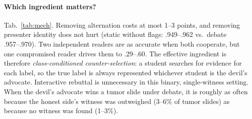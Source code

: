 \documentclass[10pt,twocolumn,letterpaper]{article}
\begin{document}
\begin{table}[t]\centering\small
\caption{\textbf{Which ingredient matters?} CAMELYON16 BA (mean$\pm$sd, 3 seeds), every protocol with its own on-policy judge from the same warm start, equal budget $B$. Static: each side selects $B/2$ items for its label without seeing the other side.}\label{tab:mech}
\setlength{\tabcolsep}{3pt}
\end{table}
\paragraph{Which ingredient matters?} Tab.~\ref{tab:mech}. Removing alternation costs at most 1--3 points, and removing presenter identity does not hurt (static without flags: .949--.962 vs.\ debate .957--.970). Two independent readers are as accurate when both cooperate, but one compromised reader drives them to .29--.60. The effective ingredient is therefore \emph{class-conditioned counter-selection}: a student searches for evidence for each label, so the true label is always represented whichever student is the devil's advocate. Interactive rebuttal is unnecessary in this binary, single-witness setting. When the devil's advocate wins a tumor slide under debate, it is roughly as often because the honest side's witness was outweighed (3--6\% of tumor slides) as because no witness was found (1--3\%).
\end{document}
